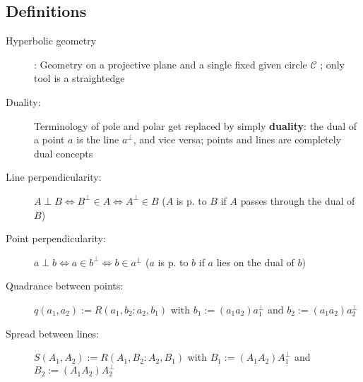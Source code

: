 \documentclass[DIV16,halfparskip]{scrartcl}
\newcommand{\nullcm}{\mathcal C}
\newcommand{\nullconic}{$\nullcm$ }
\begin{document}
\subsection{Definitions}
\begin{description}
    \item [Hyperbolic geometry]: Geometry on a projective plane and a single
        fixed given circle \nullconic; only tool is a straightedge
    \item [Duality:] Terminology of pole and polar get replaced by simply
        \textbf{duality}: the dual of a point $a$ is the line $a^\perp$, and
        vice versa; points and lines are completely dual concepts
    \item [Line perpendicularity:] $A\perp B \Leftrightarrow B^\perp \in A
        \Leftrightarrow A^\perp \in B$ ($A$ is p. to $B$ if $A$ passes through the dual of $B$)
    \item [Point perpendicularity:] $a\perp b \Leftrightarrow a\in b^\perp
        \Leftrightarrow b\in a^\perp$ ($a$ is p. to $b$ if $a$ lies on the dual of $b$)
    \item [Quadrance between points:] $q(a_1,a_2) := R(a_1,b_2:a_2,b_1)$
        with $b_1:=(a_1a_2)a_1^\perp$ and $b_2:=(a_1a_2)a_2^\perp$
    \item [Spread between lines:] $S(A_1,A_2) := R(A_1,B_2:A_2,B_1)$ with
        $B_1:=(A_1A_2)A_1^\perp$ and $B_2:=(A_1A_2)A_2^\perp$
\end{description}
\end{document}
